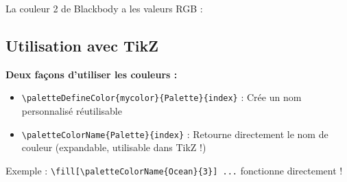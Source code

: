 \documentclass{article}
\begin{document}
La couleur 2 de Blackbody a les valeurs RGB : 

\subsection*{Utilisation avec TikZ}


\bigskip


\bigskip

\textbf{Deux façons d'utiliser les couleurs :}
\begin{itemize}
\item \texttt{\textbackslash paletteDefineColor\{mycolor\}\{Palette\}\{index\}} : Crée un nom personnalisé réutilisable
\item \texttt{\textbackslash paletteColorName\{Palette\}\{index\}} : Retourne directement le nom de couleur (expandable, utilisable dans TikZ !)
\end{itemize}

Exemple : \texttt{\textbackslash fill[\textbackslash paletteColorName\{Ocean\}\{3\}] ...} fonctionne directement !
\end{document}
